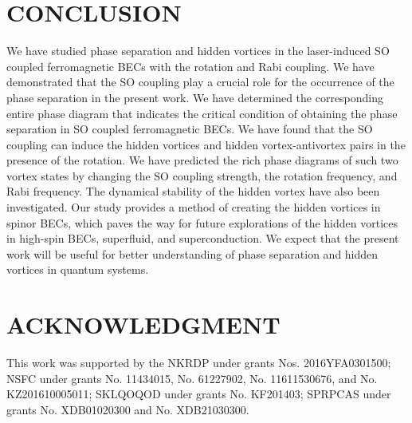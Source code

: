 \documentclass[aps,pra,showpacs,twocolumn,superscriptaddress]{revtex4-1}
\begin{document}
\section{CONCLUSION}
We have studied phase separation and hidden vortices in the laser-induced SO coupled ferromagnetic BECs with the rotation and Rabi coupling.
We have demonstrated that the SO coupling play a crucial role for the occurrence of
the phase separation in the present work. We have determined the corresponding entire phase diagram that indicates the critical
condition of obtaining the phase separation in SO coupled ferromagnetic BECs. We have found that the SO coupling can induce the hidden vortices and hidden vortex-antivortex pairs in the presence of the rotation.
We have predicted the rich phase diagrams of such two vortex states by changing the SO coupling strength, the rotation frequency, and Rabi frequency.
The dynamical stability of the hidden vortex have also been investigated.
Our study provides a method of creating the hidden vortices in spinor BECs, which paves the way for
future explorations of the hidden vortices in high-spin BECs, superfluid, and superconduction.
We expect that the present work will be useful for better
understanding of phase separation and hidden vortices in quantum systems.


\section*{ACKNOWLEDGMENT}
This work was supported by the NKRDP under grants Nos. 2016YFA0301500;
NSFC under grants No. 11434015, No. 61227902, No. 11611530676, and No. KZ201610005011;
SKLQOQOD under grants No. KF201403;
SPRPCAS under grants No. XDB01020300 and No. XDB21030300.
\end{document}
